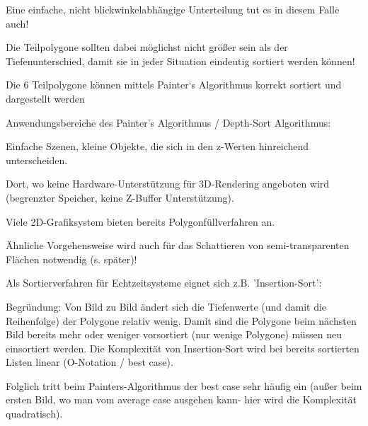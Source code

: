 \documentclass[landscape]{article}
\begin{document}
\begin{multicols}{3}
  
  \begin{itemize*}
    \item Eine einfache, nicht blickwinkelabhängige Unterteilung tut es in diesem Falle auch!
    \item Die Teilpolygone sollten dabei möglichst nicht größer sein als der Tiefenunterschied, damit sie in jeder Situation eindeutig sortiert werden können!
    \item Die 6 Teilpolygone können mittels Painter‘s Algorithmus korrekt sortiert und dargestellt werden
  \end{itemize*}
  
  Anwendungsbereiche des Painter's Algorithmus / Depth-Sort Algorithmus:
  \begin{itemize*}
    \item Einfache Szenen, kleine Objekte, die sich in den z-Werten hinreichend unterscheiden.
    \item Dort, wo keine Hardware-Unterstützung für 3D-Rendering angeboten wird (begrenzter Speicher, keine Z-Buffer Unterstützung).
    \item Viele 2D-Grafiksystem bieten bereits Polygonfüllverfahren an.
    \item Ähnliche Vorgehensweise wird auch für das Schattieren von semi-transparenten Flächen notwendig (s. später)!
  \end{itemize*}
  
  Als Sortierverfahren für Echtzeitsysteme eignet sich z.B. 'Insertion-Sort':
  \begin{itemize*}
    \item Begründung: Von Bild zu Bild ändert sich die Tiefenwerte (und damit die Reihenfolge) der Polygone relativ wenig. Damit sind die Polygone beim nächsten Bild bereits mehr oder weniger vorsortiert (nur wenige Polygone) müssen neu einsortiert werden. Die Komplexität von Insertion-Sort wird bei bereits sortierten Listen linear (O-Notation / best case).
    \item Folglich tritt beim Painters-Algorithmus der best case sehr häufig ein (außer beim ersten Bild, wo man vom average case ausgehen kann- hier wird die Komplexität quadratisch).
  \end{itemize*}
  

\end{multicols}
\end{document}
